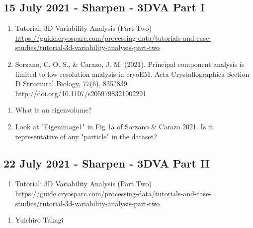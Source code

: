 \documentclass[11pt, oneside]{article}   	%
\begin{document}
\pagebreak

\subsection{15 July 2021 - Sharpen - 3DVA Part I}
\begin{enumerate}
	\item Tutorial: 3D Variability Analysis (Part Two) \url{https://guide.cryosparc.com/processing-data/tutorials-and-case-studies/tutorial-3d-variability-analysis-part-two}
	\item Sorzano, C. O. S., \& Carazo, J. M. (2021). Principal component analysis is limited to low-resolution analysis in cryoEM. Acta Crystallographica Section D Structural Biology, 77(6), 835?839. http://doi.org/10.1107/s2059798321002291
\end{enumerate}
\begin{enumerate}
	\item What is an eigenvolume?
	\item Look at "Eigenimage1" in Fig 1a of Sorzano \& Carazo 2021. Is it representative of any "particle" in the dataset?
\end{enumerate}

\subsection{22 July 2021 - Sharpen - 3DVA Part II}
\begin{enumerate}
	\item Tutorial: 3D Variability Analysis (Part Two) \url{https://guide.cryosparc.com/processing-data/tutorials-and-case-studies/tutorial-3d-variability-analysis-part-two}
\end{enumerate}
\begin{enumerate}
	\item Yuichiro Takagi
\end{enumerate}



\end{document}
